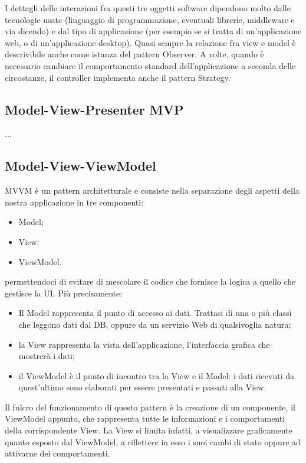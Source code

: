 I dettagli delle interazioni fra questi tre oggetti software dipendono molto dalle tecnologie usate (linguaggio di programmazione, eventuali librerie, middleware e via dicendo) e dal tipo di applicazione (per esempio se si tratta di un'applicazione web, o di un'applicazione desktop). 
Quasi sempre la relazione fra view e model è descrivibile anche come istanza del pattern Observer. A volte, quando è necessario cambiare il comportamento standard dell'applicazione a seconda delle circostanze, il controller implementa anche il pattern Strategy.

\subsection{Model-View-Presenter MVP}
...

\subsection{Model-View-ViewModel}
MVVM è un pattern architetturale e consiste nella separazione degli aspetti della nostra applicazione in tre componenti:
\begin{itemize}
\item Model;
\item View;
\item ViewModel.
\end{itemize}
permettendoci di evitare di mescolare il codice che fornisce la logica a quello che gestisce la UI.
Più precisamente:
\begin{itemize}
	\item Il Model rappresenta il punto di accesso ai dati. Trattasi di una o più classi che leggono dati dal DB, oppure da un servizio Web di qualsivoglia natura;
	\item la View rappresenta la vista dell'applicazione, l'interfaccia grafica che mostrerà i dati;
	\item il ViewModel è il punto di incontro tra la View e il Model: i dati ricevuti da quest'ultimo sono elaborati per essere presentati e passati alla View.
\end{itemize}

Il fulcro del funzionamento di questo pattern è la creazione di un componente, il ViewModel appunto, che rappresenta tutte le informazioni e i comportamenti della corrispondente View. La View si limita infatti, a visualizzare graficamente quanto esposto dal ViewModel, a riflettere in esso i suoi cambi di stato oppure ad attivarne dei comportamenti.

